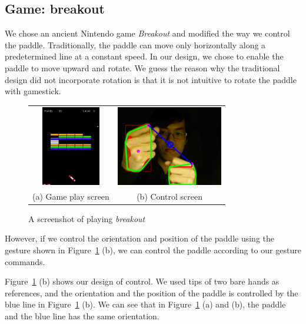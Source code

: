\documentclass[10pt,twocolumn,letterpaper]{article}
\begin{document}
\subsection{Game: breakout}
We chose an ancient Nintendo game \emph{Breakout} and modified 
the way we control the paddle. Traditionally, the paddle can 
move only horizontally along a predetermined line at a constant speed.
In our design, we chose to enable the paddle to move upward and rotate.
We guess the reason why the traditional design did not incorporate 
rotation is that 
it is not intuitive to rotate the paddle with gamestick.
\begin{figure}[h]
\centering
\begin{tabular}{cc}
\includegraphics[height=3.5cm]{game0060.png} &
\includegraphics[height=3.5cm]{gesture0060.png} \\
(a) Game play screen &
(b) Control screen
\end{tabular}
\caption{A screenshot of playing \emph{breakout}}
\label{fig:gamescreen}
\end{figure}

However, if we control the orientation and position of the paddle 
using the gesture shown in Figure~\ref{fig:gamescreen} (b), 
we can control the paddle according to our gesture commands.

Figure~\ref{fig:gamescreen} (b) shows our design of control. 
We used tips of two bare hands as references, and the orientation and 
the position of the paddle is controlled by the blue line in 
Figure~\ref{fig:gamescreen} (b). We can see that in Figure~\ref{fig:gamescreen} 
(a) and (b), the paddle and the blue line has the same orientation.
\end{document}

